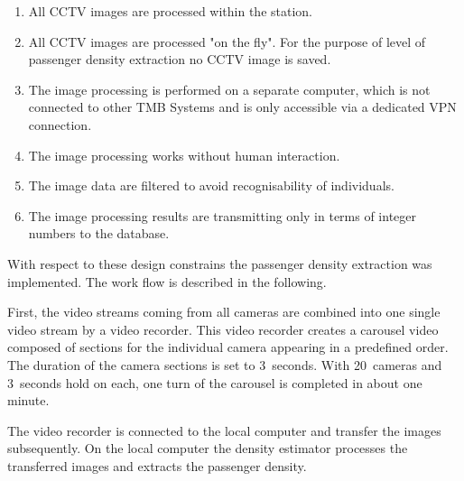 \begin{enumerate}
  \item All CCTV images are processed within the station.
      \item All CCTV images are processed "on the fly". For the purpose of level of passenger density extraction no CCTV image is saved.
  \item The image processing is performed on a separate computer, which is not connected to other TMB Systems and is only accessible via a dedicated VPN connection.
  \item The image processing works without human interaction.
  \item The image data are filtered to avoid recognisability of individuals.
  \item The image processing results are transmitting only in terms of integer numbers to the database.
\end{enumerate}

With respect to these design constrains the passenger density extraction was implemented. The work flow is described in the following.

First, the video streams coming from all cameras are combined into one single video stream by a video recorder. This video recorder creates a carousel video composed of sections for the individual camera appearing in a predefined order. The duration of the camera sections is set to 3~seconds. With 20~cameras and 3~seconds hold on each, one turn of the carousel is completed in about one minute.

The video recorder is connected to the local computer and transfer the images subsequently. On the local computer the density estimator processes the transferred images and extracts the passenger density.


